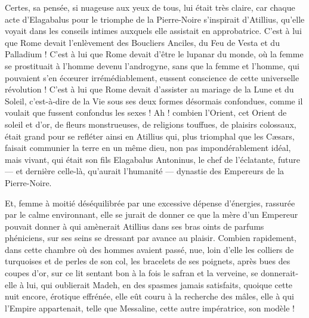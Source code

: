 \documentclass[a4paper, 11pt, oneside, polutonikogreek, french]{article}
\begin{document}
Certes, sa pensée, si nuageuse aux yeux de tous, lui était très claire, car chaque acte d'Elagabalus pour le triomphe de la Pierre-Noire s'inspirait d'Atillius, qu'elle voyait dans les conseils intimes auxquels elle assistait en approbatrice. C'est à lui que Rome devait l'enlèvement des Boucliers Anciles, du Feu de Vesta et du Palladium ! C'est à lui que Rome devait d'être le lupanar du monde, où la femme se prostituait à l'homme devenu l'androgyne, sans que la femme et l'homme, qui pouvaient s'en écœurer irrémédiablement, eussent conscience de cette universelle révolution ! C'est à lui que Rome devait d'assister au mariage de la Lune et du Soleil, c'est-à-dire de la Vie sous ses deux formes désormais confondues, comme il voulait que fussent confondus les sexes ! Ah ! combien l'Orient, cet Orient de soleil et d'or, de fleurs monstrueuses, de religions touffues, de plaisirs colossaux, était grand pour se refléter ainsi en Atillius qui, plus triomphal que les Cæsars, faisait communier la terre en un même dieu, non pas impondérablement idéal, mais vivant, qui était son fils Elagabalus Antoninus, le chef de l’éclatante, future --- et dernière celle-là, qu'aurait l'humanité --- dynastie des Empereurs de la Pierre-Noire.

Et, femme à moitié déséquilibrée par une excessive dépense d'énergies, rassurée par le calme environnant, elle se jurait de donner ce que la mère d'un Empereur pouvait donner à qui amènerait Atillius dans ses bras oints de parfums phéniciens, sur ses seins se dressant par avance au plaisir. Combien rapidement, dans cette chambre où des hommes avaient passé, nue, loin d'elle les colliers de turquoises et de perles de son col, les bracelets de ses poignets, après bues des coupes d'or, sur ce lit sentant bon à la fois le safran et la verveine, se donnerait-elle à lui, qui oublierait Madeh, en des spasmes jamais satisfaits, quoique cette nuit encore, érotique effrénée, elle eût couru à la recherche des mâles, elle à qui l'Empire appartenait, telle que Messaline, cette autre impératrice, son modèle !
\end{document}
